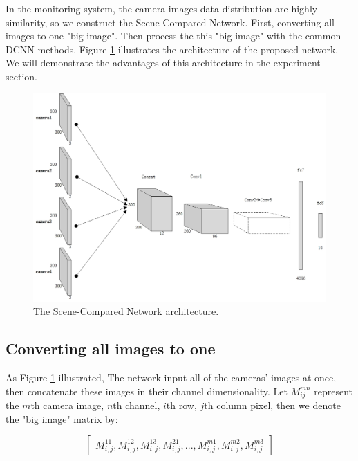 \documentclass[sensors,article,submit,moreauthors,pdftex,10pt,a4paper]{mdpi}
\begin{document}
In the monitoring system, the camera images data distribution are highly similarity, so we construct the Scene-Compared Network. First, converting all images to one "big image". Then process the this "big image" with the common DCNN methods. Figure \ref{Scene-ComparedNetArchitecture} illustrates the architecture of the proposed network. We will demonstrate the advantages of this architecture in the experiment section. 
\begin{figure}[H]
	\centering
	\includegraphics[width=15 cm]{3.jpg}
	\caption{The Scene-Compared Network architecture.}
	\label{Scene-ComparedNetArchitecture}
\end{figure}

\subsection{Converting all images to one}

As Figure \ref{Scene-ComparedNetArchitecture} illustrated, The network input all of the cameras' images at once, then concatenate these images in their channel dimensionality. Let $M_{ij}^{mn}$ represent the $m$th camera image, $n$th channel, $i$th row, $j$th column pixel, then we denote the "big image" matrix by:

\begin{equation}
\begin{bmatrix}
M_{i,j}^{11},M_{i,j}^{12},M_{i,j}^{13},M_{i,j}^{21},...,M_{i,j}^{m1},M_{i,j}^{m2},M_{i,j}^{m3}
\end{bmatrix}
\end{equation}
\end{document}
